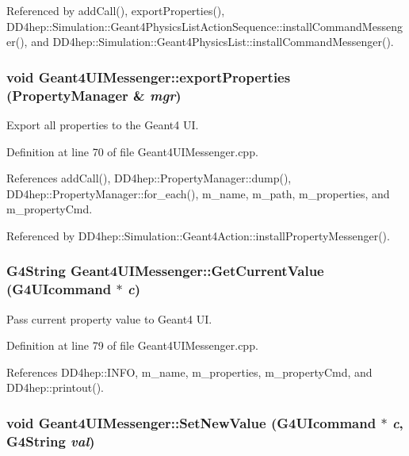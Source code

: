 Referenced by addCall(), exportProperties(), DD4hep::Simulation::Geant4PhysicsListActionSequence::installCommandMessenger(), and DD4hep::Simulation::Geant4PhysicsList::installCommandMessenger().\hypertarget{class_d_d4hep_1_1_simulation_1_1_geant4_u_i_messenger_accdcb3b4978b3ed83c400ca7e6ced993}{
\subsubsection[{exportProperties}]{\setlength{\rightskip}{0pt plus 5cm}void Geant4UIMessenger::exportProperties ({\bf PropertyManager} \& {\em mgr})}}
\label{class_d_d4hep_1_1_simulation_1_1_geant4_u_i_messenger_accdcb3b4978b3ed83c400ca7e6ced993}


Export all properties to the Geant4 UI. 

Definition at line 70 of file Geant4UIMessenger.cpp.

References addCall(), DD4hep::PropertyManager::dump(), DD4hep::PropertyManager::for\_\-each(), m\_\-name, m\_\-path, m\_\-properties, and m\_\-propertyCmd.

Referenced by DD4hep::Simulation::Geant4Action::installPropertyMessenger().\hypertarget{class_d_d4hep_1_1_simulation_1_1_geant4_u_i_messenger_a931458312c22e41fd3a49ae0a8364293}{
\subsubsection[{GetCurrentValue}]{\setlength{\rightskip}{0pt plus 5cm}G4String Geant4UIMessenger::GetCurrentValue (G4UIcommand $\ast$ {\em c})}}
\label{class_d_d4hep_1_1_simulation_1_1_geant4_u_i_messenger_a931458312c22e41fd3a49ae0a8364293}


Pass current property value to Geant4 UI. 

Definition at line 79 of file Geant4UIMessenger.cpp.

References DD4hep::INFO, m\_\-name, m\_\-properties, m\_\-propertyCmd, and DD4hep::printout().\hypertarget{class_d_d4hep_1_1_simulation_1_1_geant4_u_i_messenger_ad8599a95c5a70bc07dbb6c16e81f5894}{
\subsubsection[{SetNewValue}]{\setlength{\rightskip}{0pt plus 5cm}void Geant4UIMessenger::SetNewValue (G4UIcommand $\ast$ {\em c}, \/  G4String {\em val})}}
\label{class_d_d4hep_1_1_simulation_1_1_geant4_u_i_messenger_ad8599a95c5a70bc07dbb6c16e81f5894}


